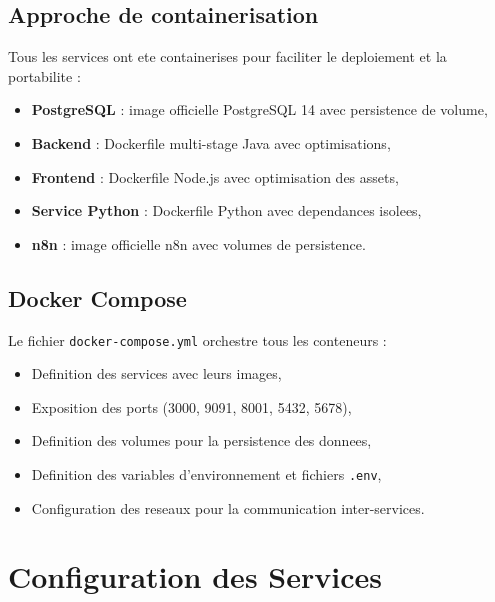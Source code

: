 \subsection{Approche de containerisation}

Tous les services ont ete containerises pour faciliter le deploiement et la portabilite :

\begin{itemize}
    \item \textbf{PostgreSQL} : image officielle PostgreSQL 14 avec persistence de volume,
    
    \item \textbf{Backend} : Dockerfile multi-stage Java avec optimisations,
    
    \item \textbf{Frontend} : Dockerfile Node.js avec optimisation des assets,
    
    \item \textbf{Service Python} : Dockerfile Python avec dependances isolees,
    
    \item \textbf{n8n} : image officielle n8n avec volumes de persistence.
\end{itemize}

\subsection{Docker Compose}

Le fichier \texttt{docker-compose.yml} orchestre tous les conteneurs :

\begin{itemize}
    \item Definition des services avec leurs images,
    
    \item Exposition des ports (3000, 9091, 8001, 5432, 5678),
    
    \item Definition des volumes pour la persistence des donnees,
    
    \item Definition des variables d'environnement et fichiers \texttt{.env},
    
    \item Configuration des reseaux pour la communication inter-services.
\end{itemize}

\section{Configuration des Services}

